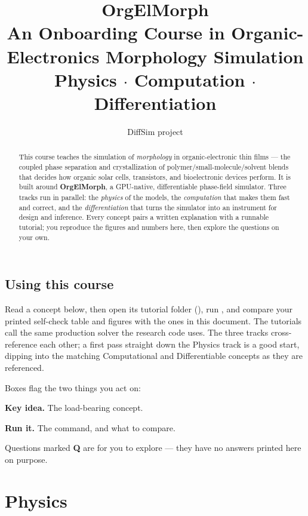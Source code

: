 \documentclass[11pt]{report}
\title{\textbf{OrgElMorph}\\[4pt]
  \large An Onboarding Course in Organic-Electronics Morphology Simulation\\[2pt]
  \normalsize Physics \; $\cdot$ \; Computation \; $\cdot$ \; Differentiation}
\author{DiffSim project}
\date{}
\begin{document}
\maketitle

\begin{abstract}
\noindent This course teaches the simulation of \emph{morphology} in
organic-electronic thin films --- the coupled phase separation and
crystallization of polymer/small-molecule/solvent blends that decides
how organic solar cells, transistors, and bioelectronic devices
perform. It is built around \textbf{OrgElMorph}, a GPU-native,
differentiable phase-field simulator. Three tracks run in parallel:
the \emph{physics} of the models, the \emph{computation} that makes
them fast and correct, and the \emph{differentiation} that turns the
simulator into an instrument for design and inference. Every concept
pairs a written explanation with a runnable tutorial; you reproduce the
figures and numbers here, then explore the questions on your own.
\end{abstract}

\tableofcontents

\chapter{Using this course}
Read a concept below, then open its tutorial folder
(), run
, and compare your printed self-check table and figures
with the ones in this document. The tutorials call the same production
solver the research code uses. The three tracks cross-reference each
other; a first pass straight down the Physics track is a good start,
dipping into the matching Computational and Differentiable concepts as
they are referenced.

Boxes flag the two things you act on:
\begin{keybox}\textbf{Key idea.} The load-bearing concept.\end{keybox}
\begin{runbox}\textbf{Run it.} The command, and what to compare.\end{runbox}
Questions marked \textbf{\textcolor{purple!70!black}{Q}} are for you to
explore --- they have no answers printed here on purpose.

\part{Physics}

\end{document}
